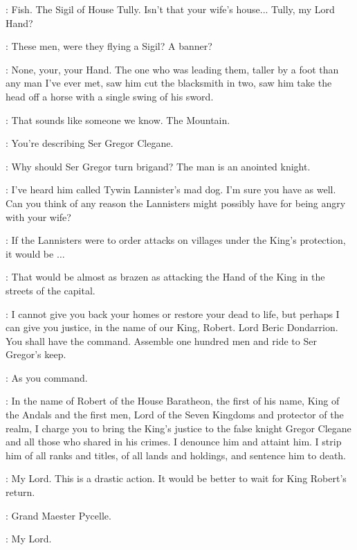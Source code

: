 \LITTLEFINGER: Fish. The Sigil of House Tully.  Isn't that your wife's house... Tully, my Lord Hand?

\NED: These men, were they flying a Sigil? A banner?

\SOUTHERNFARMER: None, your, your Hand. The one who was leading them, taller by a foot than any man I've ever met, saw him cut the blacksmith in two, saw him take the head off a horse with a single swing of his sword. 

\LITTLEFINGER:  That sounds like someone we know. The Mountain. 

\NED:  You're describing Ser Gregor Clegane. 

\PYCELLE: Why should Ser Gregor turn brigand? The man is an anointed knight. 

\LITTLEFINGER: I've heard him called Tywin Lannister's mad dog. I'm sure you have as well.  Can you think of any reason the Lannisters might possibly have for being angry with your wife?

\PYCELLE: If the Lannisters were to order attacks on villages under the King's protection, it would be $\ldots$ 

\LITTLEFINGER: That would be almost as brazen as attacking the Hand of the King in the streets of the capital. 

\NED: I cannot give you back your homes or restore your dead to life, but perhaps I can give you justice, in the name of our King, Robert. Lord Beric Dondarrion. You shall have the command. Assemble one hundred men and ride to Ser Gregor's keep.

\BERIC: As you command. 


\NED: In the name of Robert of the House Baratheon, the first of his name, King of the Andals and the first men, Lord of the Seven Kingdoms and protector of the realm, I charge you to bring the King's justice to the false knight Gregor Clegane and all those who shared in his crimes. I denounce him and attaint him. I strip him of all ranks and titles, of all lands and holdings, and sentence him to death.

\PYCELLE: My Lord. This is a drastic action. It would be better to wait for King Robert's return.

\NED: Grand Maester Pycelle. 

\PYCELLE: My Lord. 

